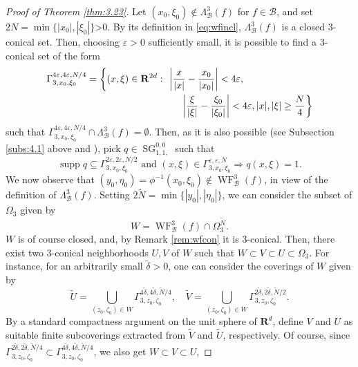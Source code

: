 \documentclass[12pt,a4paper,reqno]{amsart}
\numberwithin{equation}{section}
\numberwithin{thm}{section}
\theoremstyle{definition}
\theoremstyle{remark}
\begin{document}
\begin{proof}[Proof of Theorem \ref{thm:3.23}]
		Let $(x_0,\xi_0)\notin\Lambda^3_{{\mathcal B}}(f)$ for $f\in{{\mathcal B}}$, and 
		set $2N=\min\{|x_0|,|\xi_0|\}$>0. 
		By its definition in \eqref{eq:wfincl},
		$\Lambda^3_{{\mathcal B}}(f)$ is a closed $3$-conical set. Then, choosing $\varepsilon>0$ 
		sufficiently small, it is possible to find a $3$-conical set of the form
				\begin{align*}
			\Gamma_{3,x_0,\xi_0}^{4\varepsilon,4\varepsilon,N/4}
			&=\left\{
			(x,\xi)\in{\mathbf R^{{2d}}}\,\colon\,\left|\frac{x}{|x|}-\frac{x_0}{|x_0|}\right|<4\varepsilon,\right.
			\\
			&\hspace*{34mm}\left.\left|\frac{\xi}{|\xi|}-\frac{\xi_0}{|\xi_0|}\right|<4\varepsilon,
			|x|,|\xi|\ge \frac{N}{4}
			\right\}
		\end{align*}
				such that $\Gamma_{3,x_0,\xi_0}^{4\varepsilon,4\varepsilon,N/4}
		\cap\Lambda^3_{{\mathcal B}}(f)=\emptyset$. Then, as it is also possible (see Subsection \ref{subs:4.1} above
		and \cite{Co}), pick $q\in{\operatorname{SG}}^{0,0}_{1,1,}$ such that 
				\[
			{\operatorname{supp}} q\subseteq\Gamma^{2\varepsilon,2\varepsilon,N/2}_{3,x_0,\xi_0}
			\text{ and }
			(x,\xi)\in\Gamma^{\varepsilon,\varepsilon,N}_{3,x_0,\xi_0}\Rightarrow
			q(x,\xi)=1.
		\]
				We now observe that $(y_0,\eta_0)=\phi^{-1}(x_0,\xi_0)\notin{\operatorname{WF}}^3_{{\mathcal B}}(f)$, in view
		of the definition of $\Lambda^3_{{\mathcal B}}(f)$. Setting $2\widetilde{N}=\min\{|y_0|,|\eta_0|\}$,
		we can consider the subset of $\Omega_3$ given by
				\[
			W={\operatorname{WF}}^3_{{\mathcal B}}(f)\cap\Omega_3^{\widetilde{N}}.
		\]
				$W$ is of course closed, and, by Remark \ref{rem:wfcon} it is $3$-conical.
		Then, there exist two $3$-conical neighborhoods $U,V$ of $W$ such that 
		$W\subset V\subset U\subset\Omega_3$. For instance, for an arbitrarily small $\tilde{\delta}>0$,
		one can consider the coverings of $W$ given by
				\[
			\widetilde{U}=\bigcup_{(z_0,\zeta_0)\in W}
			\Gamma^{4\tilde{\delta},4\tilde{\delta},\widetilde{N}/4}_{3,z_0,\zeta_0},
			\quad
			\widetilde{V}=\bigcup_{(z_0,\zeta_0)\in W}
			\Gamma^{2\tilde{\delta},2\tilde{\delta},\widetilde{N}/2}_{3,z_0,\zeta_0}.
		\]
				By a standard compactness argument on the unit sphere of ${\mathbf R^{{d}}}$, define $V$ and $U$
		as suitable finite subcoverings extracted from $\widetilde{V}$ and $\widetilde{U}$, respectively.
		Of course, since 
		$\Gamma^{2\tilde{\delta},2\tilde{\delta},\widetilde{N}/4}_{3,z_0,\zeta_0}
		\subset
		\Gamma^{4\tilde{\delta},4\tilde{\delta},\widetilde{N}/4}_{3,z_0,\zeta_0}$, we also get $W\subset V \subset U$,

\end{proof}
\end{document}
